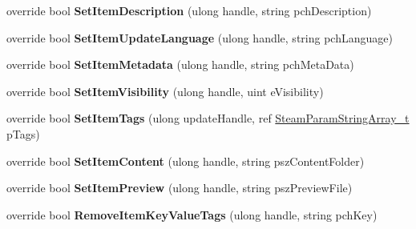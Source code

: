 \begin{DoxyCompactItemize}
override bool {\bfseries Set\+Item\+Description} (ulong handle, string pch\+Description)
\item 
\mbox{\label{class_valve_1_1_steamworks_1_1_c_steam_u_g_c_a06d586b75b91bbe2b58e94622ed7ff12}} 
override bool {\bfseries Set\+Item\+Update\+Language} (ulong handle, string pch\+Language)
\item 
\mbox{\label{class_valve_1_1_steamworks_1_1_c_steam_u_g_c_aa0306e00fdeb002795e6ddc975f0e2c4}} 
override bool {\bfseries Set\+Item\+Metadata} (ulong handle, string pch\+Meta\+Data)
\item 
\mbox{\label{class_valve_1_1_steamworks_1_1_c_steam_u_g_c_a30d10e73fe3f5badd45e36561bee870d}} 
override bool {\bfseries Set\+Item\+Visibility} (ulong handle, uint e\+Visibility)
\item 
\mbox{\label{class_valve_1_1_steamworks_1_1_c_steam_u_g_c_a3eeed8139de380e8a5981029fd831dff}} 
override bool {\bfseries Set\+Item\+Tags} (ulong update\+Handle, ref \hyperlink{struct_valve_1_1_steamworks_1_1_steam_param_string_array__t}{Steam\+Param\+String\+Array\+\_\+t} p\+Tags)
\item 
\mbox{\label{class_valve_1_1_steamworks_1_1_c_steam_u_g_c_a75aa6f8101b76f8b9256acfd3d3b0340}} 
override bool {\bfseries Set\+Item\+Content} (ulong handle, string psz\+Content\+Folder)
\item 
\mbox{\label{class_valve_1_1_steamworks_1_1_c_steam_u_g_c_a970bb206a3503f5eec508b5537cd4238}} 
override bool {\bfseries Set\+Item\+Preview} (ulong handle, string psz\+Preview\+File)
\item 
\mbox{\label{class_valve_1_1_steamworks_1_1_c_steam_u_g_c_aa90a2ce1214eba238bffff3e39b50898}} 
override bool {\bfseries Remove\+Item\+Key\+Value\+Tags} (ulong handle, string pch\+Key)
\item 
\mbox{\label{class_valve_1_1_steamworks_1_1_c_steam_u_g_c_a43a7178b04fbc08e6dc53c607131f687}} 

\end{DoxyCompactItemize}
